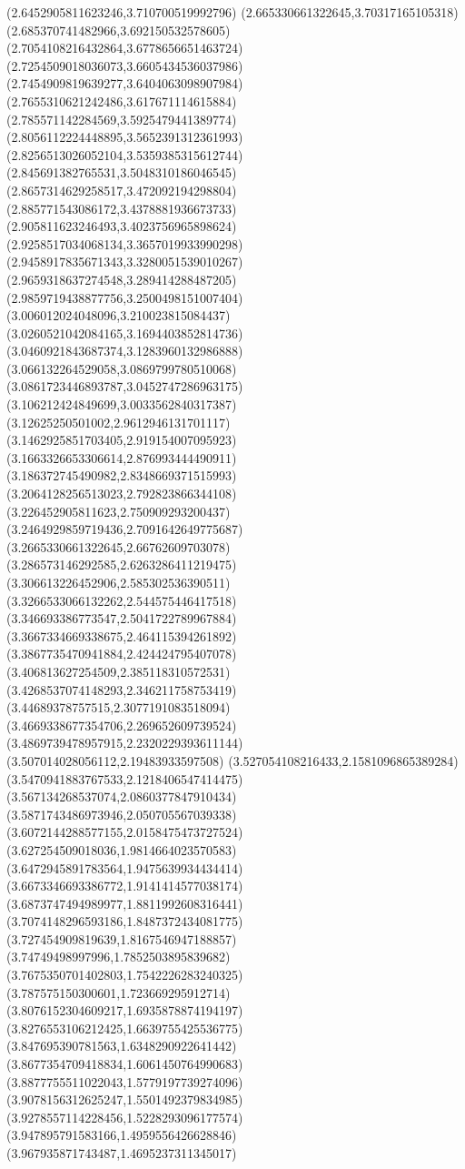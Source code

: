 {(2.6452905811623246,3.710700519992796)
(2.665330661322645,3.70317165105318)
(2.685370741482966,3.692150532578605)
(2.7054108216432864,3.6778656651463724)
(2.7254509018036073,3.6605434536037986)
(2.7454909819639277,3.6404063098907984)
(2.7655310621242486,3.617671114615884)
(2.785571142284569,3.5925479441389774)
(2.8056112224448895,3.5652391312361993)
(2.8256513026052104,3.5359385315612744)
(2.845691382765531,3.5048310186046545)
(2.8657314629258517,3.472092194298804)
(2.885771543086172,3.4378881936673733)
(2.905811623246493,3.4023756965898624)
(2.9258517034068134,3.3657019933990298)
(2.9458917835671343,3.3280051539010267)
(2.9659318637274548,3.289414288487205)
(2.9859719438877756,3.2500498151007404)
(3.006012024048096,3.210023815084437)
(3.0260521042084165,3.1694403852814736)
(3.0460921843687374,3.1283960132986888)
(3.066132264529058,3.0869799780510068)
(3.0861723446893787,3.0452747286963175)
(3.106212424849699,3.0033562840317387)
(3.12625250501002,2.9612946131701117)
(3.1462925851703405,2.919154007095923)
(3.1663326653306614,2.876993444490911)
(3.186372745490982,2.8348669371515993)
(3.2064128256513023,2.792823866344108)
(3.226452905811623,2.750909293200437)
(3.2464929859719436,2.7091642649775687)
(3.2665330661322645,2.66762609703078)
(3.286573146292585,2.6263286411219475)
(3.306613226452906,2.585302536390511)
(3.3266533066132262,2.544575446417518)
(3.346693386773547,2.5041722789967884)
(3.3667334669338675,2.464115394261892)
(3.3867735470941884,2.424424795407078)
(3.406813627254509,2.385118310572531)
(3.4268537074148293,2.346211758753419)
(3.44689378757515,2.3077191083518094)
(3.4669338677354706,2.269652609739524)
(3.4869739478957915,2.2320229393611144)
(3.507014028056112,2.19483933597508)
(3.527054108216433,2.1581096865389284)
(3.5470941883767533,2.1218406547414475)
(3.567134268537074,2.0860377847910434)
(3.5871743486973946,2.050705567039338)
(3.6072144288577155,2.0158475473727524)
(3.627254509018036,1.9814664023570583)
(3.6472945891783564,1.9475639934434414)
(3.6673346693386772,1.9141414577038174)
(3.6873747494989977,1.8811992608316441)
(3.7074148296593186,1.8487372434081775)
(3.727454909819639,1.8167546947188857)
(3.74749498997996,1.7852503895839682)
(3.7675350701402803,1.7542226283240325)
(3.787575150300601,1.723669295912714)
(3.8076152304609217,1.6935878874194197)
(3.8276553106212425,1.6639755425536775)
(3.847695390781563,1.6348290922641442)
(3.8677354709418834,1.6061450764990683)
(3.8877755511022043,1.5779197739274096)
(3.9078156312625247,1.5501492379834985)
(3.9278557114228456,1.5228293096177574)
(3.947895791583166,1.4959556426628846)
(3.967935871743487,1.4695237311345017)
}
